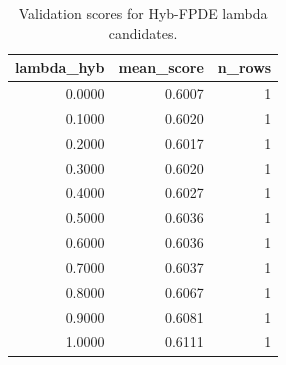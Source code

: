 \begin{table}[t]
\caption{Validation scores for Hyb-FPDE lambda candidates.}
\label{tab:lambda_distribution_computed}
\centering
\begin{tabular}{rrr}
\toprule
lambda\_hyb & mean\_score & n\_rows \\
\midrule
0.0000 & 0.6007 & 1 \\
0.1000 & 0.6020 & 1 \\
0.2000 & 0.6017 & 1 \\
0.3000 & 0.6020 & 1 \\
0.4000 & 0.6027 & 1 \\
0.5000 & 0.6036 & 1 \\
0.6000 & 0.6036 & 1 \\
0.7000 & 0.6037 & 1 \\
0.8000 & 0.6067 & 1 \\
0.9000 & 0.6081 & 1 \\
1.0000 & 0.6111 & 1 \\
\bottomrule
\end{tabular}

\end{table}
